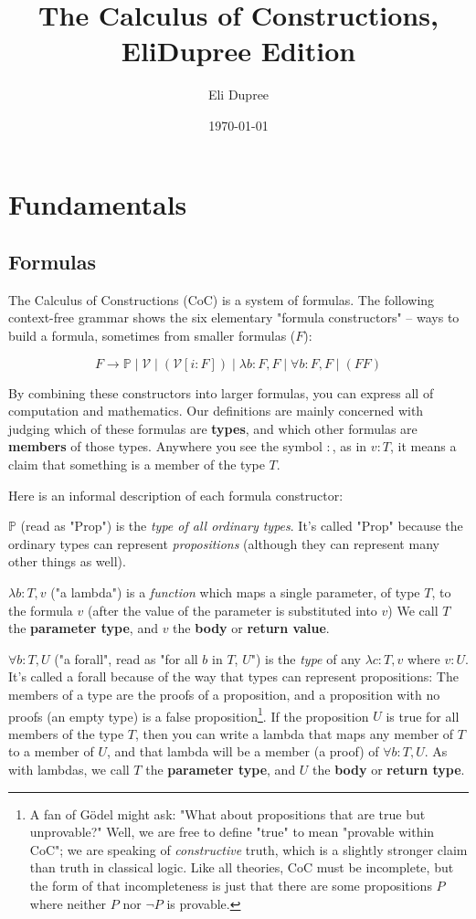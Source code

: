 \documentclass{article}
\title{The Calculus of Constructions, EliDupree Edition}
\author{Eli Dupree}
\date{\today}
\newcommand{\Prop}{\mathbb{P}}
\newcommand{\usage}{\mathcal{V}}
\newcommand{\usageKnown}[2]{(\usage[#2:#1])}
\begin{document}
  \maketitle

  \section{Fundamentals}
  \subsection{Formulas}

  The Calculus of Constructions (CoC) is a system of formulas. The following context-free grammar shows the six elementary "formula constructors" – ways to build a formula, sometimes from smaller formulas ($F$):

  \[ F \rightarrow \Prop \mid \usage \mid \usageKnown{F}{i} \mid \lambda b:F,F \mid \forall b:F,F \mid (F F) \]
  
  By combining these constructors into larger formulas, you can express all of computation and mathematics. Our definitions are mainly concerned with judging which of these formulas are \textbf{types}, and which other formulas are \textbf{members} of those types. Anywhere you see the symbol $:$, as in $v : T$, it means a claim that something is a member of the type $T$.

  Here is an informal description of each formula constructor:

  $\Prop$ (read as "Prop") is the \emph{type of all ordinary types}. It's called "Prop" because the ordinary types can represent \emph{propositions} (although they can represent many other things as well).
  
  $\lambda b:T,v$ ("a lambda") is a \emph{function} which maps a single parameter, of type $T$, to the formula $v$ (after the value of the parameter is substituted into $v$) We call $T$ the \textbf{parameter type}, and $v$ the \textbf{body} or \textbf{return value}.
  
  $\forall b:T,U$ ("a forall", read as "for all $b$ in $T$, $U$") is the \emph{type} of any $\lambda c:T,v$ where $v : U$. It's called a forall because of the way that types can represent propositions: The members of a type are the proofs of a proposition, and a proposition with no proofs (an empty type) is a false proposition\footnote{A fan of Gödel might ask: "What about propositions that are true but unprovable?" Well, we are free to define "true" to mean "provable within CoC"; we are speaking of \emph{constructive} truth, which is a slightly stronger claim than truth in classical logic. Like all theories, CoC must be incomplete, but the form of that incompleteness is just that there are some propositions $P$ where neither $P$ nor $\neg P$ is provable.}. If the proposition $U$ is true for all members of the type $T$, then you can write a lambda that maps any member of $T$ to a member of $U$, and that lambda will be a member (a proof) of $\forall b:T,U$. As with lambdas, we call $T$ the \textbf{parameter type}, and $U$ the \textbf{body} or \textbf{return type}.
  
\end{document}
